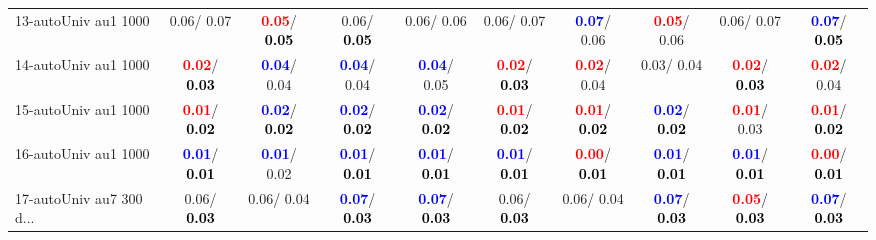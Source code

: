 \begin{table}[h]
\begin{center}
{\begin{tabular}{lc|c|c|c|c|c|c|c|c}
13-autoUniv au1 1000 &   0.06/  0.07 & \textcolor{red}{\textbf{  0.05}}/\textcolor{black}{\textbf{  0.05}} &   0.06/\textcolor{black}{\textbf{  0.05}} &   0.06/  0.06 &   0.06/  0.07 & \textcolor{blue}{\textbf{  0.07}}/  0.06 & \textcolor{red}{\textbf{  0.05}}/  0.06 &   0.06/  0.07 & \textcolor{blue}{\textbf{  0.07}}/\textcolor{black}{\textbf{  0.05}} \\
14-autoUniv au1 1000 & \textcolor{red}{\textbf{  0.02}}/\textcolor{black}{\textbf{  0.03}} & \textcolor{blue}{\textbf{  0.04}}/  0.04 & \textcolor{blue}{\textbf{  0.04}}/  0.04 & \textcolor{blue}{\textbf{  0.04}}/  0.05 & \textcolor{red}{\textbf{  0.02}}/\textcolor{black}{\textbf{  0.03}} & \textcolor{red}{\textbf{  0.02}}/  0.04 &   0.03/  0.04 & \textcolor{red}{\textbf{  0.02}}/\textcolor{black}{\textbf{  0.03}} & \textcolor{red}{\textbf{  0.02}}/  0.04 \\ \hline
15-autoUniv au1 1000 & \textcolor{red}{\textbf{  0.01}}/\textcolor{black}{\textbf{  0.02}} & \textcolor{blue}{\textbf{  0.02}}/\textcolor{black}{\textbf{  0.02}} & \textcolor{blue}{\textbf{  0.02}}/\textcolor{black}{\textbf{  0.02}} & \textcolor{blue}{\textbf{  0.02}}/\textcolor{black}{\textbf{  0.02}} & \textcolor{red}{\textbf{  0.01}}/\textcolor{black}{\textbf{  0.02}} & \textcolor{red}{\textbf{  0.01}}/\textcolor{black}{\textbf{  0.02}} & \textcolor{blue}{\textbf{  0.02}}/\textcolor{black}{\textbf{  0.02}} & \textcolor{red}{\textbf{  0.01}}/  0.03 & \textcolor{red}{\textbf{  0.01}}/\textcolor{black}{\textbf{  0.02}} \\
16-autoUniv au1 1000 & \textcolor{blue}{\textbf{  0.01}}/\textcolor{black}{\textbf{  0.01}} & \textcolor{blue}{\textbf{  0.01}}/  0.02 & \textcolor{blue}{\textbf{  0.01}}/\textcolor{black}{\textbf{  0.01}} & \textcolor{blue}{\textbf{  0.01}}/\textcolor{black}{\textbf{  0.01}} & \textcolor{blue}{\textbf{  0.01}}/\textcolor{black}{\textbf{  0.01}} & \textcolor{red}{\textbf{  0.00}}/\textcolor{black}{\textbf{  0.01}} & \textcolor{blue}{\textbf{  0.01}}/\textcolor{black}{\textbf{  0.01}} & \textcolor{blue}{\textbf{  0.01}}/\textcolor{black}{\textbf{  0.01}} & \textcolor{red}{\textbf{  0.00}}/\textcolor{black}{\textbf{  0.01}} \\
17-autoUniv au7 300 d... &   0.06/\textcolor{black}{\textbf{  0.03}} &   0.06/  0.04 & \textcolor{blue}{\textbf{  0.07}}/\textcolor{black}{\textbf{  0.03}} & \textcolor{blue}{\textbf{  0.07}}/\textcolor{black}{\textbf{  0.03}} &   0.06/\textcolor{black}{\textbf{  0.03}} &   0.06/  0.04 & \textcolor{blue}{\textbf{  0.07}}/\textcolor{black}{\textbf{  0.03}} & \textcolor{red}{\textbf{  0.05}}/\textcolor{black}{\textbf{  0.03}} & \textcolor{blue}{\textbf{  0.07}}/\textcolor{black}{\textbf{  0.03}} \\

\end{tabular}}
\end{center}
\end{table}

